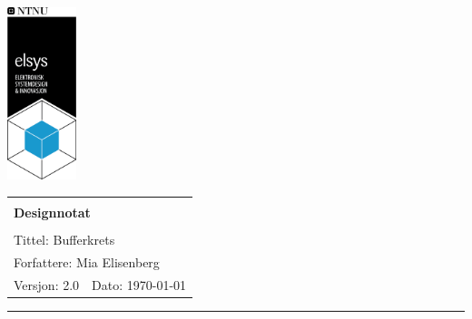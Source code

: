 \documentclass[a4paper,11pt,norsk]{article}
\begin{document}
\begin{minipage}[c]{0.15\textwidth}
\includegraphics[width=2.0cm]{elsys_pos_staaende_ntnu}  
\end{minipage}
\begin{minipage}[c]{0.85\textwidth}

\renewcommand{\arraystretch}{1.7}
\large 
\begin{tabularx}{\textwidth}{|X|X|}
\hline
\multicolumn{2}{|l|}{} \\
\multicolumn{2}{|l|}{\huge \textbf{Designnotat}} \\
\multicolumn{2}{|l|}{}  \\
\hline
\multicolumn{2}{|l|}{Tittel: 
Bufferkrets
} \\
\hline
\multicolumn{2}{|l|}{Forfattere: 
Mia Elisenberg
} \\
\hline
Versjon: 2.0 & Dato: \today
\\
\hline 
\end{tabularx}
\end{minipage}
\normalsize


\setlength{\parskip}{0ex}
\renewcommand{\baselinestretch}{0.1}\normalsize
\tableofcontents
\renewcommand{\baselinestretch}{1.00}\normalsize
\setlength{\parskip}{2ex}
\rule{\textwidth}{1pt}


\newpage


\clearpage
\clearpage
\clearpage
\clearpage
\clearpage







\newpage



\end{document}
